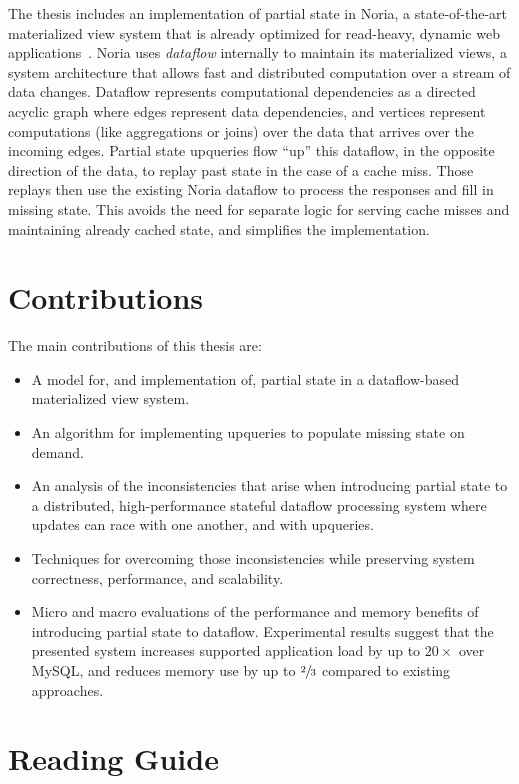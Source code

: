 The thesis includes an implementation of partial state in Noria, a
state-of-the-art materialized view system that is already optimized for
read-heavy, dynamic web applications~\cite{noria}. Noria uses \textit{dataflow}
internally to maintain its materialized views, a system architecture that allows
fast and distributed computation over a stream of data changes. Dataflow
represents computational dependencies as a directed acyclic graph where edges
represent data dependencies, and vertices represent computations (like
aggregations or joins) over the data that arrives over the incoming edges.
Partial state upqueries flow ``up'' this dataflow, in the opposite direction of
the data, to replay past state in the case of a cache miss. Those replays then
use the existing Noria dataflow to process the responses and fill in missing
state. This avoids the need for separate logic for serving cache misses and
maintaining already cached state, and simplifies the implementation.

\section{Contributions}
\label{s:contrib}

The main contributions of this thesis are:

\begin{itemize}
 \item A model for, and implementation of, partial state in a dataflow-based
   materialized view system.
 \item An algorithm for implementing upqueries to populate missing state on
   demand.
 \item An analysis of the inconsistencies that arise when introducing partial
   state to a distributed, high-performance stateful dataflow processing system
    where updates can race with one another, and with upqueries.
 \item Techniques for overcoming those inconsistencies while preserving system
   correctness, performance, and scalability.
 \item Micro and macro evaluations of the performance and memory benefits of
   introducing partial state to dataflow. Experimental results suggest that the
    presented system increases supported application load by up to $20\times$
    over MySQL, and reduces memory use by up to $\sfrac{2}{3}$ compared to
    existing approaches.
\end{itemize}

\section{Reading Guide}
\label{s:read}

